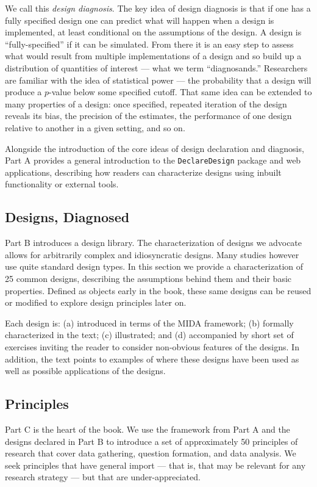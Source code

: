 \documentclass[11pt]{article}
\begin{document}
We call this \textit{design diagnosis}. The key idea of design diagnosis is that if one has a fully specified design one can predict what will happen when a design is implemented, at least conditional on the assumptions of the design. A design is ``fully-specified'' if it can be simulated. From there it is an easy step to assess what would result from multiple implementations of a design and so build up a distribution of quantities of interest --- what we term ``diagnosands.'' Researchers are familiar with the idea of statistical power --- the probability that a design will produce a $p$-value below some specified cutoff. That same idea can be extended to many properties of a design: once specified, repeated iteration of the design reveals its bias, the precision of the estimates, the performance of one design relative to another in a given setting, and so on. 

Alongside the introduction of the core ideas of design declaration and diagnosis, Part A provides a general introduction to the \texttt{DeclareDesign} package and web applications, describing how readers can characterize designs using inbuilt functionality or external tools.


\subsection{Designs, Diagnosed}

Part B introduces a design library. The characterization of designs we advocate allows for arbitrarily complex and idiosyncratic designs. Many studies however use quite standard design types. In this section we provide a characterization of 25 common designs, describing the assumptions behind them and their basic properties. Defined as objects early in the book, these same designs can be reused or modified to explore design principles later on. 

Each design is: (a) introduced in terms of the MIDA framework; (b) formally characterized in the text; (c) illustrated; and (d) accompanied by short set of exercises inviting the reader to consider non-obvious features of the designs. In addition, the text points to examples of where these designs have been used as well as possible applications of the designs.

\subsection{Principles}

Part C is the heart of the book. We use the framework from Part A and the designs declared in Part B to introduce a set of approximately 50 principles of research that cover data gathering, question formation, and data analysis. We seek principles that have general import --- that is, that may be relevant for any research strategy --- but that are under-appreciated.
\end{document}
